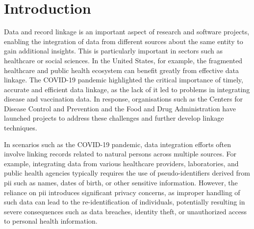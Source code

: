 
\chapter{Introduction}  \label{sec:introduction}
Data and record linkage is an important aspect of research and software projects, enabling the integration of data from different sources about the same entity to gain additional insights.
This is particularly important in sectors such as healthcare or social sciences.
In the United States, for example, the fragmented healthcare and public health ecosystem can benefit greatly from effective data linkage.
The COVID-19 pandemic highlighted the critical importance of timely, accurate and efficient data linkage, as the lack of it led to problems in integrating disease and vaccination data.
In response, organisations such as the Centers for Disease Control and Prevention and the Food and Drug Administration have launched projects to address these challenges and further develop linkage techniques. \cite{pathak2024privacy}

In scenarios such as the COVID-19 pandemic, data integration efforts often involve linking records related to natural persons across multiple sources. 
For example, integrating data from various healthcare providers, laboratories, and public health agencies typically requires the use of pseudo-identifiers derived from \ac{pii} such as names, dates of birth, or other sensitive information. 
However, the reliance on \ac{pii} introduces significant privacy concerns, as improper handling of such data can lead to the re-identification of individuals, potentially resulting in severe consequences such as data breaches, identity theft, or unauthorized access to personal health information.

